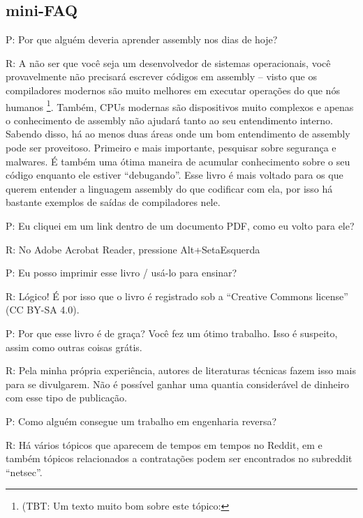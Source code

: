 \subsection*{mini-FAQ}


\par P: Por que alguém deveria aprender assembly nos dias de hoje?
\par R: A não ser que você seja um desenvolvedor de sistemas operacionais, você provavelmente não precisará escrever códigos em assembly – visto que os compiladores modernos são muito melhores em executar operações 
do que nós humanos
\footnote{(\ac{TBT}: Um texto muito bom sobre este tópico: \InSqBrackets{\AgnerFog}}.
Também, \ac{CPU}s modernas são dispositivos muito complexos e apenas o conhecimento de assembly não ajudará tanto ao seu entendimento interno. Sabendo disso, há ao menos duas áreas onde um bom entendimento de assembly pode ser proveitoso. Primeiro e mais importante, pesquisar sobre segurança e malwares. É também uma ótima maneira de acumular conhecimento sobre o seu código enquanto ele estiver “debugando”. Esse livro é mais voltado para os que querem entender a linguagem assembly do que codificar com ela, por isso há bastante exemplos de saídas de compiladores nele.

\par P: Eu cliquei em um link dentro de um documento PDF, como eu volto para ele?
\par R: No Adobe Acrobat Reader, pressione Alt+SetaEsquerda

\par P: Eu posso imprimir esse livro / usá-lo para ensinar?
\par R: Lógico! É por isso que o livro é registrado sob a “Creative Commons license” (CC BY-SA 4.0).

\par P: Por que esse livro é de graça? Você fez um ótimo trabalho. Isso é suspeito, assim como outras coisas grátis.
\par R: Pela minha própria experiência, autores de literaturas técnicas fazem isso mais para se divulgarem. Não é possível ganhar uma quantia considerável de dinheiro com esse tipo de publicação.

\par P: Como alguém consegue um trabalho em engenharia reversa?
\par R: Há vários tópicos que aparecem de tempos em tempos no Reddit\FNURLREDDIT{}, em 
e também tópicos relacionados a contratações podem ser encontrados no subreddit ``netsec''.

